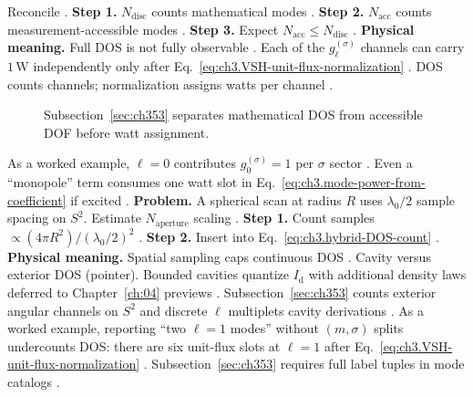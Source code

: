 Reconcile \cite{harrington2001}.
\textbf{Step 1.} \(N_{\mathrm{disc}}\) counts mathematical modes \cite{hansen1988}.
\textbf{Step 2.} \(N_{\mathrm{acc}}\) counts measurement-accessible modes \cite{harrington2001}.
\textbf{Step 3.} Expect \(N_{\mathrm{acc}}\le N_{\mathrm{disc}}\) \cite{stratton1941}.
\textbf{Physical meaning.} Full DOS is not fully observable \cite{harrington2001}.
Each of the \(g_{\ell}^{(\sigma)}\) channels can carry \(1\,\mathrm{W}\) independently only after
Eq.~\eqref{eq:ch3.VSH-unit-flux-normalization} \cite{poynting1884}. DOS counts channels; normalization
assigns watts per channel \cite{stratton1941}.
\begin{figure}[t]
\centering
{}
\caption{Subsection~\ref{sec:ch353} separates mathematical DOS from accessible DOF before watt assignment.}
\label{fig:ch3.353-accessible-dos}
\end{figure}
As a worked example, \(\ell=0\) contributes \(g_{0}^{(\sigma)}=1\) per \(\sigma\) sector \cite{jackson1999}. Even a ``monopole'' term
consumes one watt slot in Eq.~\eqref{eq:ch3.mode-power-from-coefficient} if excited \cite{harrington2001}.
\textbf{Problem.} A spherical scan at radius \(R\) uses \(\lambda_0/2\) sample spacing on \(S^{2}\). Estimate
\(N_{\mathrm{aperture}}\) scaling \cite{harrington2001}.
\textbf{Step 1.} Count samples \(\propto(4\pi R^{2})/(\lambda_0/2)^{2}\) \cite{jackson1999}.
\textbf{Step 2.} Insert into Eq.~\eqref{eq:ch3.hybrid-DOS-count} \cite{hansen1988}.
\textbf{Physical meaning.} Spatial sampling caps continuous DOS \cite{harrington2001}.
Cavity versus exterior DOS (pointer). Bounded cavities quantize \(I_{\mathrm{d}}\) with additional density laws deferred to Chapter~\ref{ch:04} previews
\cite{jackson1999}. Subsection~\ref{sec:ch353} counts exterior angular channels on \(S^{2}\) and discrete
\(\ell\) multiplets cavity derivations \cite{hansen1988}.
As a worked example, reporting ``two \(\ell=1\) modes'' without \((m,\sigma)\) splits undercounts DOS: there are six unit-flux slots at
\(\ell=1\) after Eq.~\eqref{eq:ch3.VSH-unit-flux-normalization} \cite{belinfante1940}.
Subsection~\ref{sec:ch353} requires full label tuples in mode catalogs \cite{stratton1941}.
